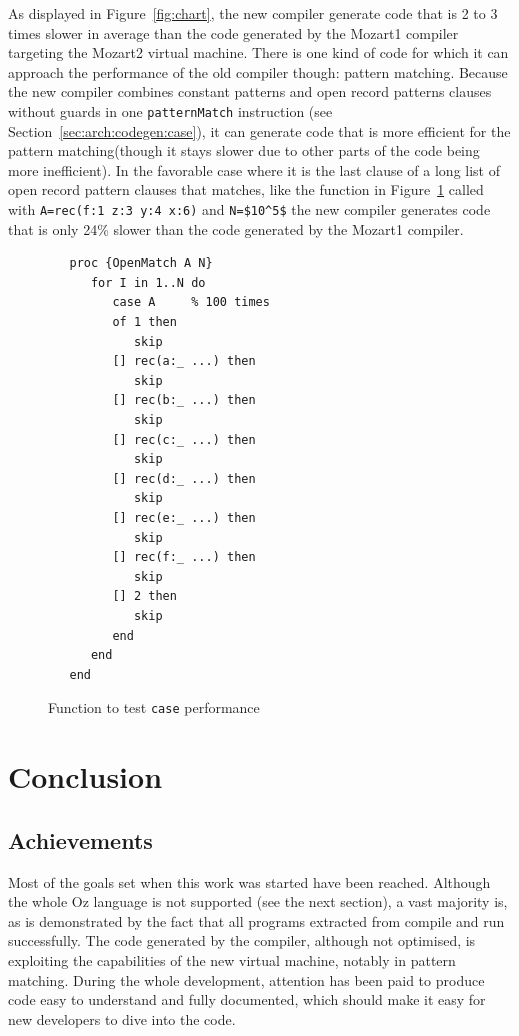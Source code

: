 \documentclass[a4paper]{memoir}
\begin{document}
As displayed in Figure~\ref{fig:chart}, the new compiler generate code that is 2 to 3 times slower in average than the code generated by the Mozart1 compiler targeting the Mozart2 virtual machine. There is one kind of code
for which it can approach the performance of the old compiler though: pattern
matching. Because the new compiler combines constant patterns and open record
patterns clauses without guards in one \lstinline!patternMatch! instruction (see
Section~\ref{sec:arch:codegen:case}), it can generate code that
is more efficient for the pattern matching(though it stays slower due to other parts of the code being more
inefficient).
In the favorable case where it is the last clause of a long list of open record
pattern clauses that matches, like the function in
Figure~\ref{fig:perf:openmatch} called with \lstinline!A=rec(f:1 z:3 y:4 x:6)!
and \lstinline[mathescape]!N=$10^5$! the new compiler generates code that is only 24\% slower than the
code generated by the Mozart1 compiler.


\begin{figure}[h]
\begin{lstlisting}
   proc {OpenMatch A N}
      for I in 1..N do
         case A     % 100 times
         of 1 then
            skip
         [] rec(a:_ ...) then
            skip
         [] rec(b:_ ...) then
            skip
         [] rec(c:_ ...) then
            skip
         [] rec(d:_ ...) then
            skip
         [] rec(e:_ ...) then
            skip
         [] rec(f:_ ...) then
            skip
         [] 2 then
            skip
         end
      end
   end
\end{lstlisting}
\caption{Function to test \lstinline!case! performance}
\label{fig:perf:openmatch}
\end{figure}


\chapter{Conclusion}
\section{Achievements}
Most of the goals set when this work was started have been reached.
Although the whole Oz language is not supported (see the next section), a vast majority is, as is demonstrated by the fact that all programs extracted from \cite{VRH04} compile and run successfully. The code generated by the compiler, although not optimised, is exploiting the capabilities of the new virtual machine, notably in pattern matching.  During the whole development, attention has been paid to produce code easy to understand and fully documented, which should make it easy for new developers to dive into the code.
\end{document}
